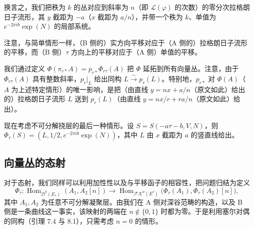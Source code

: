 \documentclass[11pt,a4paper]{article}
\theoremstyle{plain}
\theoremstyle{definition}
\begin{document}
换言之，我们把秩为 $k$ 的丛对应到斜率为 $n$（即 $\mathcal{L}(\varphi)$ 的次数）的零分次拉格朗日子流形，其 $y$ 截距为 $-a$（$x$ 截距为 $a/n$），并带一个秩为 $k$、单值为 $e^{-2\pi ib}\exp(N)$ 的局部系统。

注意，与简单情形一样，（B 侧的）实方向平移对应于（A 侧的）拉格朗日子流形的平移，而（B 侧）$\tau$ 方向上的平移对应于（A 侧）单值的平移。

我们通过定义 $\Phi(\pi_{r*}A)=p_{r*}\Phi_{r\tau}(A)$ 把 $\Phi$ 延拓到所有向量丛。注意，由于 $\Phi_{r\tau}(A)$ 具有整数斜率，$p_r|_L$ 给出同构 $L\xrightarrow{\sim}p_r(L)$。特别地，$p_{r*}$ 对 $\Phi(A)$（$A$ 为上述特定情形）的唯一影响，是把（由直线 $y=nx+a/n$（原文如此）给出的）拉格朗日子流形 $L$ 送到 $p_r(L)$（由直线 $y=nx/r+ra/n$（原文如此）给出）。

现在考虑不可分解挠层的最后一种情形。设 $S=S(-a\tau-b,V,N)$，则 $\Phi_\tau(S)=(L,1/2,e^{-2\pi ib}\exp(N))$，其中 $L$ 由 $x$ 截距为 $a$ 的竖直线给出。



\subsection{向量丛的态射}

对于态射，我们同样可以利用加性性以及与平移函子的相容性，把问题归结为定义
\[
\Phi_\tau:\operatorname{Hom}_{\mathcal{D}^b(E_\tau)}(A_1,A_2[n])\to\operatorname{Hom}_{\mathcal{FK}^0(E^\tau)}\bigl(\Phi_\tau(A_1),\Phi_\tau(A_2)[n]\bigr),
\]
其中 $A_1,A_2$ 为任意不可分解凝聚层。由我们在 A 侧对深谷范畴的构造，以及 B 侧是一条曲线这一事实，该映射的两端在 $n\notin\{0,1\}$ 时都为零。于是利用塞尔对偶的同构（引理 7.4 与 8.1），只需考虑 $n=0$ 的情形。
\end{document}
